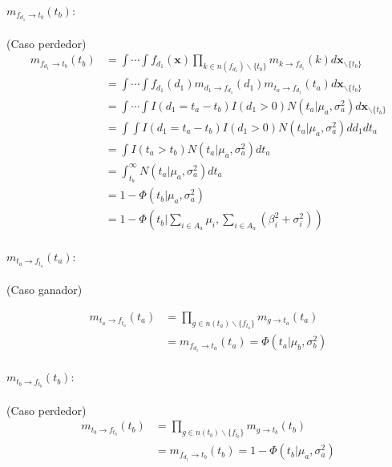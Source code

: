 \documentclass[11pt,twoside,spanish]{report} %
\begin{document}
\paragraph{$m_{f_{d_1} \rightarrow t_b}(t_b):$} (Caso perdedor)
\begin{equation}
	\begin{split}
		m_{f_{d_1}\rightarrow t_b}(t_b) & = \int\cdots\int f_{d_1}(\textbf{x})\prod_{k\in n(f_{d_1})\backslash\{t_b\}} m_{k\rightarrow f_{d_1}}(k)d\textbf{x}_{\backslash \{t_b\}} \\
		& = \int\cdots\int f_{d_1}(d_1)m_{d_1\rightarrow f_{d_1}}(d_1)m_{t_a\rightarrow f_{d_1}}(t_a)d\textbf{x}_{\backslash\{t_b\}}\\
		& = \int\cdots\int I(d_1=t_a-t_b)I(d_1>0)N(t_a \vert \mu_a,\sigma_a^2)d\textbf{x}_{\backslash\{t_b\}}\\
		& =\int\int  I(d_1=t_a-t_b)I(d_1>0)N(t_a \vert \mu_a,\sigma_a^2)dd_1dt_a\\
		& =\int I(t_a>t_b)N(t_a \vert \mu_a,\sigma_a^2)dt_a\\
		& =\int_{t_b}^{\infty}N(t_a \vert \mu_a,\sigma_a^2)dt_a\\
		& = 1 - \Phi(t_b \vert \mu_a,\sigma_a^2) \\
		& =  1- \Phi(t_b \vert \sum_{i\in A_a}\mu_i,\sum_{i\in A_a}(\beta_i^2+\sigma_i^2))
	\end{split}
\end{equation}

\paragraph{$m_{t_a \rightarrow f_{t_a}}(t_a):$} (Caso ganador)

\begin{equation}
	\begin{split}
		m_{t_a \rightarrow f_{t_a}}(t_a) & = \prod_{g\in n(t_a)\backslash\{f_{t_a}\}} m_{g \rightarrow t_a} (t_a) \\
		&=  m_{f_{d_1} \rightarrow t_a} (t_a)=\Phi(t_a|\mu_b,\sigma_b^2)
	\end{split}
\end{equation}

\paragraph{$m_{t_b \rightarrow f_{t_b}}(t_b):$} (Caso perdedor)
\begin{equation}
	\begin{split}
		m_{t_b \rightarrow f_{t_b}}(t_b) & =\prod_{g\in n(t_b)\backslash\{f_{t_b}\}} m_{g \rightarrow t_b} (t_b)\\
		&=  m_{f_{d_1} \rightarrow t_b} (t_b)=1- \Phi(t_b|\mu_a,\sigma_a^2)
	\end{split}
\end{equation}
\end{document}
